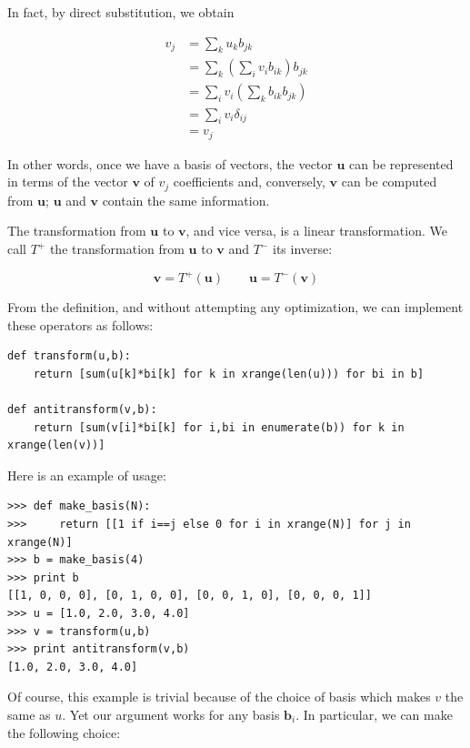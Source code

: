\documentclass[justified,sixbynine]{tufte-book}
\theoremstyle{plain}%
\theoremstyle{definition}
\theoremstyle{remark}
\begin{document}
\begin{fullwidth}
In fact, by direct substitution, we obtain

\begin{align}
  v_j &= \sum_k u_k b_{jk} \\
      &= \sum_k (\sum_i v_i b_{ik}) b_{jk} \\
      &= \sum_i v_i (\sum_k b_{ik} b_{jk}) \\
      &= \sum_i v_i \delta_{ij} \\
      &= v_j
\end{align}

In other words, once we have a basis of vectors, the vector $\mathbf{u}$ can be represented in terms of the vector $\mathbf{v}$ of $v_j$ coefficients and, conversely, $\mathbf{v}$ can be computed from $\mathbf{u}$; $\mathbf{u}$ and $\mathbf{v}$ contain the same information.

The transformation from $\mathbf{u}$ to $\mathbf{v}$, and vice versa, is a linear transformation. We call $T^+$ the transformation from $\mathbf{u}$ to $\mathbf{v}$  and $T^-$ its inverse:

\begin{equation}
\mathbf{v} = T^+(\mathbf{u}) \qquad
\mathbf{u} = T^-(\mathbf{v})
\end{equation}

From the definition, and without attempting any optimization, we can implement these operators as follows:

\begin{lstlisting}
def transform(u,b):
    return [sum(u[k]*bi[k] for k in xrange(len(u))) for bi in b]

def antitransform(v,b):
    return [sum(v[i]*bi[k] for i,bi in enumerate(b)) for k in xrange(len(v))]
\end{lstlisting}

Here is an example of usage:

\begin{lstlisting}
>>> def make_basis(N):
>>>     return [[1 if i==j else 0 for i in xrange(N)] for j in xrange(N)]
>>> b = make_basis(4)
>>> print b
[[1, 0, 0, 0], [0, 1, 0, 0], [0, 0, 1, 0], [0, 0, 0, 1]]
>>> u = [1.0, 2.0, 3.0, 4.0]
>>> v = transform(u,b)
>>> print antitransform(v,b)
[1.0, 2.0, 3.0, 4.0]
\end{lstlisting}

Of course, this example is trivial because of the choice of basis which makes $v$ the same as $u$. Yet our argument works for any basis $\mathbf{b}_i$. In particular, we can make the following choice:



\end{fullwidth}
\end{document}
